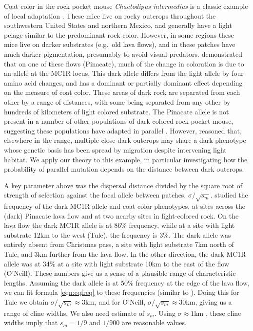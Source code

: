 \documentclass{article}
\newcommand{\citep}[1]{\cite{#1}}
\newcommand{\citet}[1]{\cite{#1}}
\begin{document}
Coat color in the rock pocket mouse
\emph{Chaetodipus intermedius} is a classic example of local
adaptation 
\citep{benson1933concealing,DiceBlossom1937}.
These mice live on rocky outcrops throughout the southwestern United States and northern Mexico, 
and generally have a light pelage similar to the predominant rock color.
However, in some regions these mice live on darker substrates (e.g.\ old lava flows),
and in these patches have much darker pigmentation, 
presumably to avoid visual predators.
\citet{nachman2003genetic} demonstrated that on one of these flows (Pinacate), 
much of the change in coloration is due to an allele at the MC1R locus.
This dark allele differs from the light allele by four amino acid changes, 
and has a dominant or partially dominant effect depending on the measure of coat color.
These areas of dark rock are separated from each other by a range of distances, 
with some being separated from any other by hundreds of kilometers of light colored substrate. 
The Pinacate allele is not present in a number of other populations of dark colored rock pocket mouse, 
suggesting these populations have adapted in parallel \citep{nachman2003genetic,hoekstra2003different}.
However, \citet{hoekstra2004local} reasoned that, elsewhere in the range, 
multiple close dark outcrops may share a dark phenotype whose genetic basis has been spread by migration
despite intervening light habitat. 
We apply our theory to this example,
in particular investigating how the probability of parallel mutation depends on 
the distance between dark outcrops.

A key parameter above was the dispersal distance divided by the square root of strength of selection against the focal allele between patches, $\sigma/\sqrt{s_m}$. 
\citet{hoekstra2004ecological} studied the frequency of the dark MC1R allele and coat color phenotypes, 
at sites across the (dark) Pinacate lava flow and at two nearby sites in light-colored rock.
On the lava flow the dark MC1R allele is at 86\% frequency,
while at a site with light substrate 12km to the west (Tule), the frequency is 3\%.
The dark allele was entirely absent from Christmas pass, a site with light substrate 7km north of Tule, and 3km further from the lava flow.
In the other direction, the dark MC1R allele was at 34\% at a site with light substrate 10km to the east of the flow (O'Neill).
These numbers give us a sense of a plausible range of characteristic lengths.
Assuming the dark allele is at 50\% frequency at the edge of the lava flow, 
we can fit formula \eqref{eqn:eqfreq} to these frequencies
(similar to \citet{hoekstra2004ecological}).
Doing this for Tule we obtain $\sigma/\sqrt{s_m} \approx 3$km, 
and for O'Neill, $\sigma/\sqrt{s_m} \approx 30$km, giving us a range of cline widths. 
We also need estimate of $s_m$. 
Using $\sigma \approx 1$km \citep{french1968dispersal,allred1963range}, 
these cline widths imply that $s_m=1/9$ and $1/900$ are reasonable values.
\end{document}
